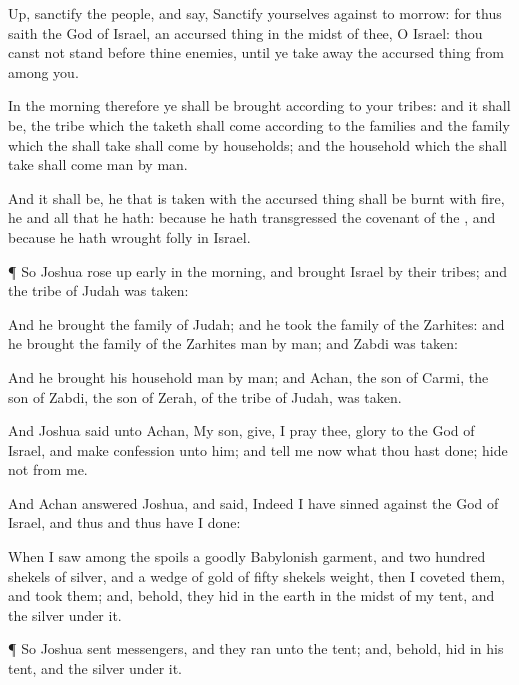 {Up,
sanctify the
people, and
say,
Sanctify yourselves against to
morrow: for thus
saith the
{}
God of
Israel,
{} an accursed
thing in the
midst of thee, O
Israel: thou
canst not
stand
before thine
enemies, until ye take
away the accursed
thing from
among you.

In the
morning therefore ye shall be
brought according to your
tribes: and it shall be,
{} the
tribe which the
{}
taketh shall
come according to the
families
{} and the
family which the
{} shall
take shall
come by
households; and the
household which the
{} shall
take shall
come
man by
man.

And it shall be,
{} he that is
taken with the accursed
thing shall be
burnt with
fire, he and all that he hath: because he hath
transgressed the
covenant of the
{}, and because he hath
wrought
folly in
Israel.


\par }{\PP {}¶ So
Joshua rose up
early in the
morning, and
brought
Israel by their
tribes; and the
tribe of
Judah was
taken:

And he
brought the
family of
Judah; and he
took the
family of the
Zarhites: and he
brought the
family of the
Zarhites
man by
man; and
Zabdi was
taken:

And he
brought his
household
man by
man; and
Achan, the
son of
Carmi, the
son of
Zabdi, the
son of
Zerah, of the
tribe of
Judah, was
taken.

And
Joshua
said unto
Achan, My
son,
give, I pray thee,
glory to the
{}
God of
Israel, and
make
confession unto him; and
tell me now what thou hast
done;
hide
{} not from me.

And
Achan
answered
Joshua, and
said,
Indeed I have
sinned against the
{}
God of
Israel, and thus and thus have I
done:

When I
saw among the
spoils
a
goodly
Babylonish
garment, and two
hundred
shekels of
silver, and
a
wedge of
gold of
fifty
shekels
weight, then I
coveted them, and
took them; and, behold, they
{}
hid in the
earth in the
midst of my
tent, and the
silver under it.


\par }{\PP {}¶ So
Joshua
sent
messengers, and they
ran unto the
tent; and, behold,
{}
hid in his
tent, and the
silver under it.

}

